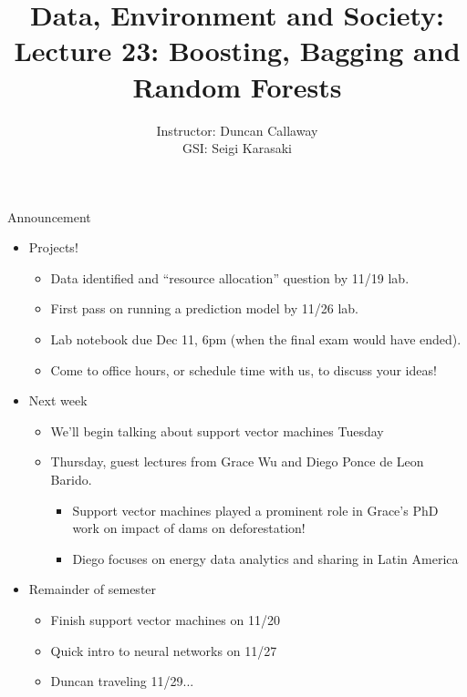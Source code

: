 \documentclass[mathserif, aspectratio=169]{beamer}
\title[Lecture 23] %
{Data, Environment and Society: \\{Lecture 23: Boosting, Bagging and Random Forests}}
\author[ER190C: Data, Environment and Society] 
{Instructor: Duncan Callaway\\
GSI: Seigi Karasaki}
\institute[UC Berkeley] %
 {\small{ \bf November 8, 2018}}
\date[November 8, 2018]
\begin{document}
\frame{
  \titlepage
}

\begin{frame}{Announcement}

\begin{itemize}
\item Projects!
\begin{itemize}
\item Data identified and ``resource allocation'' question by 11/19 lab.
\item First pass on running a prediction model by 11/26 lab.
\item Lab notebook due Dec 11, 6pm (when the final exam would have ended).
\item Come to office hours, or schedule time with us, to discuss your ideas!
\end{itemize}
\item Next week
\begin{itemize}
\item We'll begin talking about support vector machines Tuesday
\item Thursday, guest lectures from Grace Wu and Diego Ponce de Leon Barido.
\begin{itemize}
\item Support vector machines played a prominent role in Grace's PhD work on impact of dams on deforestation!
\item Diego focuses on energy data analytics and sharing in Latin America
\end{itemize}
\end{itemize}
\item Remainder of semester
\begin{itemize}
\item Finish support vector machines on 11/20
\item Quick intro to neural networks on 11/27
\item Duncan traveling 11/29...
\end{itemize}
\end{itemize}


\end{frame}
\end{document}
